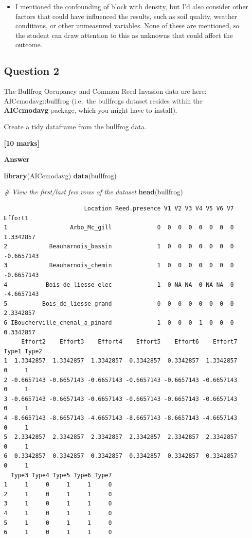 \documentclass[
  10t,
]{article}
\newenvironment{Shaded}{\begin{snugshade}}{\end{snugshade}}
\newcommand{\CommentTok}[1]{\textcolor[rgb]{0.56,0.35,0.01}{\textit{#1}}}
\newcommand{\FunctionTok}[1]{\textcolor[rgb]{0.13,0.29,0.53}{\textbf{#1}}}
\newcommand{\NormalTok}[1]{#1}
\providecommand{\tightlist}{%
  \setlength{\itemsep}{0pt}\setlength{\parskip}{0pt}}\usepackage{longtable,booktabs,array}
\renewcommand{\ttfamily}{\small\fontspec{FiraCode Nerd Font}\color{DeepSkyBlue4}}
\renewcommand{\texttt}[1]{{\ttfamily #1}}
\begin{document}
\begin{itemize}
\tightlist
\item
  I mentioned the confounding of block with density, but I'd also
  consider other factors that could have influenced the results, such as
  soil quality, weather conditions, or other unmeasured variables. None
  of these are mentioned, so the student can draw attention to this as
  unknowns that could affect the outcome.
\end{itemize}

\subsection{Question 2}\label{question-2-1}

The Bullfrog Occupancy and Common Reed Invasion data are here:
\texttt{AICcmodavg::bullfrog} (i.e.~the \texttt{bullfrogs} dataset
resides within the \textbf{AICcmodavg} package, which you might have to
install).

Create a tidy dataframe from the bullfrog data.

\textbf{{[}10 marks{]}}

\textbf{Answer}

\begin{Shaded}
\begin{Highlighting}[]
\FunctionTok{library}\NormalTok{(AICcmodavg)}
\FunctionTok{data}\NormalTok{(bullfrog)}

\CommentTok{\# View the first/last few rows of the dataset}
\FunctionTok{head}\NormalTok{(bullfrog)}
\end{Highlighting}
\end{Shaded}

\begin{verbatim}
                       Location Reed.presence V1 V2 V3 V4 V5 V6 V7    Effort1
1                  Arbo_Mc_gill             0  0  0  0  0  0  0  0  1.3342857
2            Beauharnois_bassin             1  0  0  0  0  0  0  0 -0.6657143
3            Beauharnois_chemin             1  0  0  0  0  0  0  0 -0.6657143
4           Bois_de_liesse_elec             1  0 NA NA  0 NA NA  0 -4.6657143
5          Bois_de_liesse_grand             0  0  0  0  0  0  0  0  2.3342857
6 IBoucherville_chenal_a_pinard             1  0  0  0  1  0  0  0  0.3342857
     Effort2    Effort3    Effort4    Effort5    Effort6    Effort7 Type1 Type2
1  1.3342857  1.3342857  1.3342857  0.3342857  0.3342857  1.3342857     0     1
2 -0.6657143 -0.6657143 -0.6657143 -0.6657143 -0.6657143 -0.6657143     0     1
3 -0.6657143 -0.6657143 -0.6657143 -0.6657143 -0.6657143 -0.6657143     0     1
4 -8.6657143 -8.6657143 -4.6657143 -8.6657143 -8.6657143 -4.6657143     0     1
5  2.3342857  2.3342857  2.3342857  2.3342857  2.3342857  2.3342857     0     1
6  0.3342857  0.3342857  0.3342857  0.3342857  0.3342857  0.3342857     0     1
  Type3 Type4 Type5 Type6 Type7
1     1     0     1     1     0
2     1     0     1     1     0
3     1     0     1     1     0
4     1     0     1     1     0
5     1     0     1     1     0
6     1     0     1     1     0
\end{verbatim}
\end{document}

